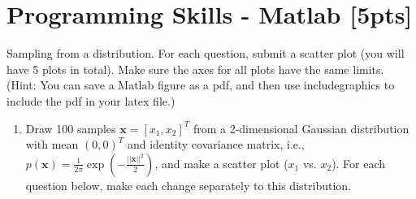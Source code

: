 \documentclass[a4paper]{article}
\theoremstyle{definition}
\begin{document}
\section{Programming Skills - Matlab [5pts]}
Sampling from a distribution.  For each question, submit a scatter plot (you will have 5 plots in total).  Make sure the axes for all plots have the same limits.  (Hint: You can save a Matlab figure as a pdf, and then use includegraphics to include the pdf in your latex file.)
\begin{enumerate}
\item Draw 100 samples $\mathbf{x} = [x_1, x_2]^T$ from a
  2-dimensional Gaussian distribution with mean $(0, 0)^T$ and
  identity covariance matrix, i.e.,
  $p(\mathbf{x}) =
  \frac{1}{2\pi}\exp\left(-\frac{||\mathbf{x}||^2}{2}\right)$, and
  make a scatter plot ($x_1$ vs. $x_2$).  For each question below, make each change separately to
  this distribution.
  

\end{enumerate}
\end{document}
